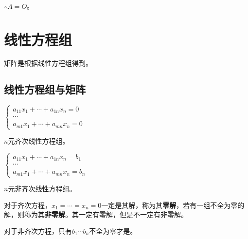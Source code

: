 \documentclass[UTF8, 12pt]{ctexart}
\begin{document}
$\therefore A=O$。

\section{线性方程组}

矩阵是根据线性方程组得到。

\subsection{线性方程组与矩阵}

\begin{multicols}{2}
    
    $\begin{cases}
        a_{11}x_1+\cdots+a_{1n}x_n=0 \\
        \cdots \\
        a_{m1}x_1+\cdots+a_{mn}x_n=0
    \end{cases}$ \medskip
    
    $n$元齐次线性方程组。

    $\begin{cases}
        a_{11}x_1+\cdots+a_{1n}x_n=b_1 \\
        \cdots \\
        a_{m1}x_1+\cdots+a_{mn}x_n=b_n
    \end{cases}$ \medskip
    
    $n$元非齐次线性方程组。

\end{multicols}

对于齐次方程，$x_1=\cdots=x_n=0$一定是其解，称为其\textbf{零解}，若有一组不全为零的解，则称为其\textbf{非零解}。其一定有零解，但是不一定有非零解。

对于非齐次方程，只有$b_1\cdots b_n$不全为零才是。
\end{document}
